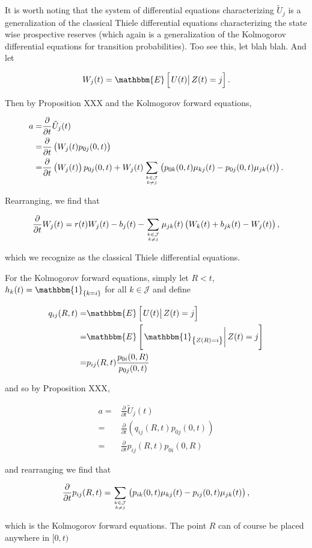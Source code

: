 \documentclass{book}
\newcommand{\1}[1]{\mathbbm{1}_{\left\lbrace #1 \right\rbrace}}
\newcommand{\econd}[2][def]{\mathbbm{E} \left[ \left. #1 \right| #2 \right]}
\theoremstyle{break}
\theoremstyle{remark}
\newenvironment{remark}
  {\pushQED{\qed}\renewcommand{\qedsymbol}{\scalebox{1.4}{$\circ$}}\remarkx}
  {\popQED\endremarkx}
\numberwithin{equation}{section}
\begin{document}
\begin{remark}
It is worth noting that the system of differential equations characterizing $\tilde{U}_j$ is a generalization of the classical Thiele differential equations characterizing the state wise prospective reserves (which again is a generalization of the Kolmogorov differential equations for transition probabilities). Too see this, let blah blah. And let

\begin{align*}
    W_j(t) = \econd[U(t)]{Z(t)=j}.
\end{align*}

Then by Proposition XXX and the Kolmogorov forward equations,

\begin{align*}
    a =& \frac{\partial}{\partial t} \tilde{U}_j(t) \\
    =& \frac{\partial}{\partial t} \left( W_j(t) p_{0j}(0,t) \right) \\
    =& \frac{\partial}{\partial t} \left( W_j(t) \right) p_{0j}(0,t) + W_j(t) \sum_{k \in \mathcal{J} \atop k \neq j} \left(p_{0k}(0,t) \mu_{kj}(t) - p_{0j}(0,t) \mu_{jk}(t) \right).
\end{align*}

Rearranging, we find that

\begin{align*}
    \frac{\partial}{\partial t} W_j(t) = r(t)W_j(t) - b_j(t) - \sum_{k \in \mathcal{J} \atop k \neq j} \mu_{jk}(t) \left( W_k(t) + b_{jk}(t) - W_j(t) \right),
\end{align*}

which we recognize as the classical Thiele differential equations.

For the Kolmogorov forward equations, simply let $R<t$, $h_{k}(t) = \1{k=i}$ for all $k \in \mathcal{J}$ and define

\begin{align*}
    q_{ij}(R,t) =& \econd[U(t)]{Z(t)=j} \\
    =& \econd[\1{Z(R)=i}]{Z(t)=j} \\
    =& p_{ij}(R,t) \frac{p_{0i}(0,R)}{p_{0j}(0,t)}
\end{align*}

and so by Proposition XXX,

\begin{align*}
    a =& \frac{\partial}{\partial t} \tilde{U}_j(t) \\
    =& \frac{\partial}{\partial t} \left( q_{ij}(R,t) p_{0j}(0,t) \right) \\
    =& \frac{\partial}{\partial t} p_{ij}(R,t) p_{0i}(0,R)
\end{align*}

and rearranging we find that

\begin{align*}
    \frac{\partial}{\partial t} p_{ij}(R,t) = \sum_{k \in \mathcal{J} \atop k \neq j} \left(p_{ik}(0,t) \mu_{kj}(t) - p_{ij}(0,t) \mu_{jk}(t) \right),
\end{align*}

which is the Kolmogorov forward equations. The point $R$ can of course be placed anywhere in $[0,t)$
\end{remark}
\end{document}
